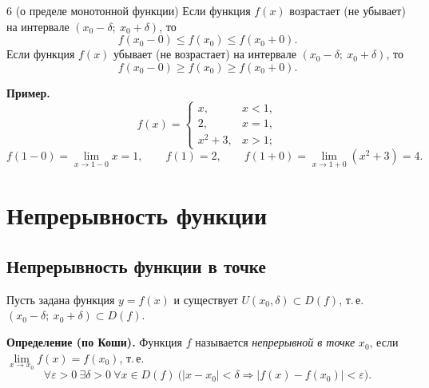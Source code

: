 \documentclass[a4paper,11pt]{article}
\newcommand{\prim}{\textbf{Пример.}\ }
\begin{document}
\begin{teor}{6 (о пределе монотонной функции)}
  Если функция $f(x)$ возрастает (не убывает) на интервале $(x_0 - \delta;\ x_0 + \delta)$, то
  \[
    f(x_0 - 0) \le f(x_0) \le f(x_0 + 0).
  \]
  Если функция $f(x)$ убывает (не возрастает) на интервале $(x_0 - \delta;\ x_0 + \delta)$, то
  \[
    f(x_0 - 0) \ge f(x_0) \ge f(x_0 + 0).
  \]
\end{teor}

\prim
\[
  f(x) =
  \begin{cases}
    x, & x < 1,\\
    2, & x = 1,\\
    x^2 + 3, & x > 1;
  \end{cases}
\]
\[
  f(1 - 0) = \lim_{x \to 1 - 0} x = 1, \qquad f(1) = 2, \qquad
  f(1 + 0) = \lim_{x \to 1 + 0} (x^2 + 3) = 4.
\]

\begin{center}
\end{center}

\section{Непрерывность функции}

\subsection{Непрерывность функции в точке}

Пусть задана функция $y = f(x)$ и существует $U(x_0, \delta) \subset D(f)$, т.\,е.
$(x_0 - \delta;\ x_0 + \delta) \subset D(f)$.

\begin{opr}
\textbf{Определение (по Коши).} Функция $f$ называется \emph{непрерывной в точке} $x_0$, если
$\lim\limits_{x \to x_0} f(x) = f(x_0)$, т.\,е.
\[
  \forall \varepsilon > 0\ \exists \delta > 0\ \forall x \in D(f)\
  \bigl( |x - x_0| < \delta \Rightarrow |f(x) - f(x_0)| < \varepsilon \bigr).
\]
\end{opr}
\end{document}
